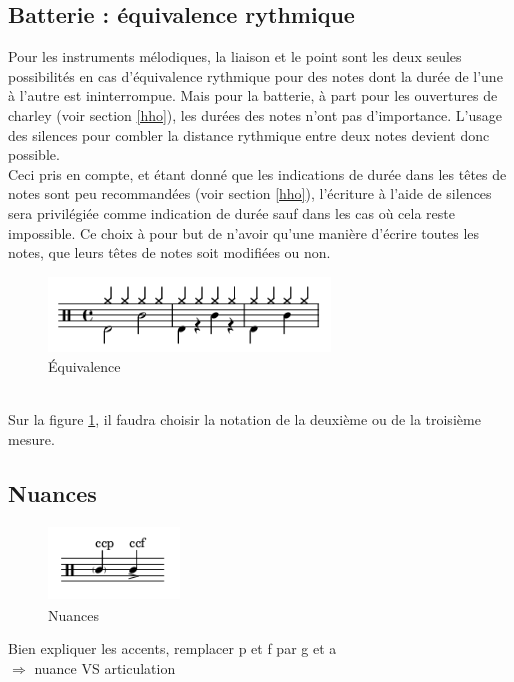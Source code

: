 \subsection*{Batterie : équivalence rythmique}
Pour les instruments mélodiques, la liaison et le point sont les deux seules possibilités en cas d’équivalence rythmique pour des notes dont la durée de l’une à l’autre est ininterrompue. Mais pour la batterie, à part pour les ouvertures de charley (voir section \ref{hho}), les durées des notes n’ont pas d’importance. L’usage des silences pour combler la distance rythmique entre deux notes devient donc possible.\\
Ceci pris en compte, et étant donné que les indications de durée dans les têtes de notes sont peu recommandées (voir section \ref{hho}), l’écriture à l’aide de silences sera privilégiée comme indication de durée sauf dans les cas où cela reste impossible. Ce choix à pour but de n’avoir qu’une manière d’écrire toutes les notes, que leurs têtes de notes soit modifiées ou non.
\begin{figure}[h]
	\centering
	\includegraphics[height=20mm, width=75mm]{z_images/3_methodes/equivalence.png}
	\caption{Équivalence}
	\label{equivalence}
\end{figure}\\
Sur la figure \ref{equivalence}, il faudra choisir la notation de la deuxième ou de la troisième mesure.
\subsection*{Nuances}
\begin{figure}[!h]
	\centering
	\includegraphics[height=20mm, width=35mm]{z_images/description_notation/nuances.png}
	\caption{Nuances}
\end{figure}
Bien expliquer les accents, remplacer p et f par g et a\\
$\Rightarrow$ nuance VS articulation\

